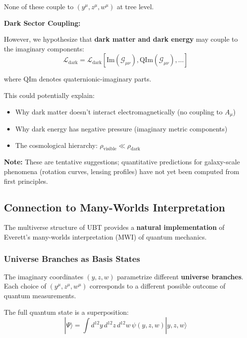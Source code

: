 None of these couple to $(y^{\mu}, z^{\mu}, w^{\mu})$ at tree level.

\textbf{Dark Sector Coupling:}

However, we hypothesize that \textbf{dark matter and dark energy} may couple to the imaginary components:
\begin{equation}
\mathcal{L}_{\text{dark}} = \mathcal{L}_{\text{dark}}[\text{Im}(\mathcal{G}_{\mu\nu}), \text{QIm}(\mathcal{G}_{\mu\nu}), \dots]
\end{equation}

where $\text{QIm}$ denotes quaternionic-imaginary parts.

This could potentially explain:
\begin{itemize}
\item Why dark matter doesn't interact electromagnetically (no coupling to $A_{\mu}$)
\item Why dark energy has negative pressure (imaginary metric components)
\item The cosmological hierarchy: $\rho_{\text{visible}} \ll \rho_{\text{dark}}$
\end{itemize}

\textbf{Note:} These are tentative suggestions; quantitative predictions for galaxy-scale phenomena (rotation curves, lensing profiles) have not yet been computed from first principles.

\subsection{Connection to Many-Worlds Interpretation}

The multiverse structure of UBT provides a \textbf{natural implementation} of Everett's many-worlds interpretation (MWI) of quantum mechanics.

\subsubsection{Universe Branches as Basis States}

The imaginary coordinates $(y, z, w)$ parametrize different \textbf{universe branches}. Each choice of $(y^{\mu}, z^{\mu}, w^{\mu})$ corresponds to a different possible outcome of quantum measurements.

The full quantum state is a superposition:
\begin{equation}
|\Psi\rangle = \int d^{12}y\,d^{12}z\,d^{12}w \, \psi(y, z, w) |y, z, w\rangle
\end{equation}

